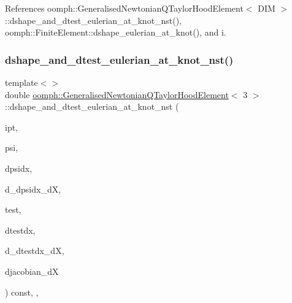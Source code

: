 References oomph\+::\+Generalised\+Newtonian\+Q\+Taylor\+Hood\+Element$<$ D\+I\+M $>$\+::dshape\+\_\+and\+\_\+dtest\+\_\+eulerian\+\_\+at\+\_\+knot\+\_\+nst(), oomph\+::\+Finite\+Element\+::dshape\+\_\+eulerian\+\_\+at\+\_\+knot(), and i.

\mbox{\label{classoomph_1_1GeneralisedNewtonianQTaylorHoodElement_a1af80e7020a0010004b2500b68ed1e87}} 
\subsubsection{\texorpdfstring{dshape\+\_\+and\+\_\+dtest\+\_\+eulerian\+\_\+at\+\_\+knot\+\_\+nst()}{dshape\_and\_dtest\_eulerian\_at\_knot\_nst()}\hspace{0.1cm}{\footnotesize\ttfamily [4/4]}}
{\footnotesize\ttfamily template$<$$>$ \\
double \hyperlink{classoomph_1_1GeneralisedNewtonianQTaylorHoodElement}{oomph\+::\+Generalised\+Newtonian\+Q\+Taylor\+Hood\+Element}$<$ 3 $>$\+::dshape\+\_\+and\+\_\+dtest\+\_\+eulerian\+\_\+at\+\_\+knot\+\_\+nst (\begin{DoxyParamCaption}\item[{const unsigned \&}]{ipt,  }\item[{\hyperlink{classoomph_1_1Shape}{Shape} \&}]{psi,  }\item[{\hyperlink{classoomph_1_1DShape}{D\+Shape} \&}]{dpsidx,  }\item[{\hyperlink{classoomph_1_1RankFourTensor}{Rank\+Four\+Tensor}$<$ double $>$ \&}]{d\+\_\+dpsidx\+\_\+dX,  }\item[{\hyperlink{classoomph_1_1Shape}{Shape} \&}]{test,  }\item[{\hyperlink{classoomph_1_1DShape}{D\+Shape} \&}]{dtestdx,  }\item[{\hyperlink{classoomph_1_1RankFourTensor}{Rank\+Four\+Tensor}$<$ double $>$ \&}]{d\+\_\+dtestdx\+\_\+dX,  }\item[{\hyperlink{classoomph_1_1DenseMatrix}{Dense\+Matrix}$<$ double $>$ \&}]{djacobian\+\_\+dX }\end{DoxyParamCaption}) const\hspace{0.3cm}{\ttfamily [inline]}, {\ttfamily [protected]}, {\ttfamily [virtual]}}

